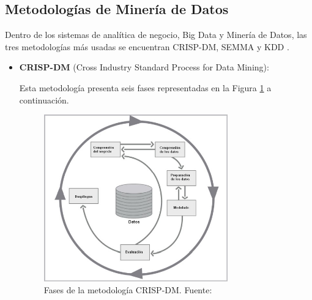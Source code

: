 \subsection{Metodologías de Minería de Datos}

Dentro de los sistemas de analítica de negocio, Big Data y Minería de Datos, las tres metodologías más usadas se encuentran CRISP-DM, SEMMA y KDD \parencite{tec_braulio2015metodologiasdm}.
\begin{itemize}
	\item \textbf{CRISP-DM} (Cross Industry Standard Process for Data Mining):
	
	Esta metodología presenta seis fases representadas en la Figura \ref{2:fig8} a continuación.
	\begin{figure}[h]
		\begin{center}
			\includegraphics[width=0.75\textwidth]{2/figures/crispdm.jpg}
			\caption{Fases de la metodología CRISP-DM. Fuente: \cite{tec_braulio2015metodologiasdm}}
			\label{2:fig8}
		\end{center}
	\end{figure}
		

\end{itemize}
